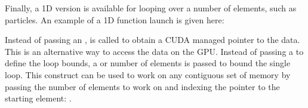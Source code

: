\documentclass[letterpaper,10pt,english]{sphinxmanual}
\begin{document}
\sphinxAtStartPar
Finally, a 1D version is available for looping over a number of elements, such as particles.
An example of a 1D function launch is given here:

\begin{sphinxVerbatim}[commandchars=\\\{\}]
    
       \PYG{p}{[}\PYG{p}{]}
        
          

    \PYG{p}{[}\PYG{p}{]}   
        \PYG{p}{[}\PYG{p}{]}  

\end{sphinxVerbatim}

\sphinxAtStartPar
Instead of passing an ,  is called to obtain a
CUDA managed pointer to the  data.  This is an alternative way to access
the  data on the GPU. Instead of passing a  to define the loop
bounds, a  or  number of elements is passed to bound the single
 loop.  This construct can be used to work on any contiguous set of memory by
passing the number of elements to work on and indexing the pointer to the starting
element: .
\end{document}
